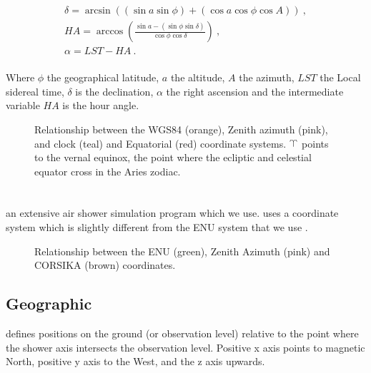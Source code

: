 \begin{equation}
    \begin{array}{l}
        \delta = \arcsin{\left((\sin{a} \sin{\phi}) +
                               (\cos{a} \cos{\phi} \cos{A})\right)} \ , \\
        \mathit{HA} = \arccos{\left(\frac{\sin{a} - (\sin{\phi} \sin{\delta})}
                                         {\cos{\phi} \cos{\delta}}\right)} \ , \\
        \alpha = \mathit{LST} - \mathit{HA} \ . \\
    \end{array}
\end{equation}

Where $\phi$ the geographical latitude, $a$ the altitude, $A$ the
azimuth, $\mathit{LST}$ the Local sidereal time, $\delta$ is the
declination, $\alpha$ the right ascension and the intermediate variable
$\mathit{HA}$ is the hour angle.


\begin{figure}
    \centering
    
    \caption{Relationship between the WGS84 (orange), Zenith azimuth (pink), 
             and clock (teal) and Equatorial (red) coordinate systems.
             $\vernal$ points to the vernal equinox, the point where the
             ecliptic and celestial equator cross in the Aries zodiac.}
    \label{fig:wgs84_equatorial}
\end{figure}


\section{\corsika}

\corsika an extensive air shower simulation program which we use.
\corsika uses a coordinate system which is slightly different from the
ENU system that we use \cite{heck:2013aa}.

\begin{figure}
    \centering
    
    \caption{Relationship between the ENU (green), Zenith Azimuth (pink)
             and CORSIKA (brown) coordinates.}
    \label{fig:enu_corsika}
\end{figure}


\subsection{Geographic}

\corsika defines positions on the ground (or observation level) relative
to the point where the shower axis intersects the observation level.
Positive x axis points to magnetic North, positive y axis to the West,
and the z axis upwards.

